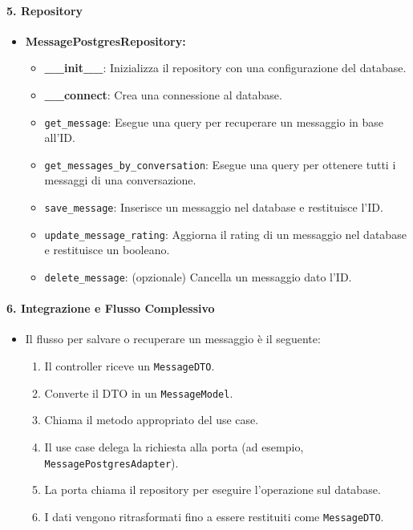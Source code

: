     \paragraph{5. Repository}
    \begin{itemize}
        \item \textbf{MessagePostgresRepository:}
        \begin{itemize}
            \item \textbf{\_\_init\_\_}: Inizializza il repository con una configurazione del database.
            \item \textbf{\_\_connect}: Crea una connessione al database.
            \item \texttt{get\_message}: Esegue una query per recuperare un messaggio in base all’ID.
            \item \texttt{get\_messages\_by\_conversation}: Esegue una query per ottenere tutti i messaggi di una conversazione.
            \item \texttt{save\_message}: Inserisce un messaggio nel database e restituisce l'ID.
            \item \texttt{update\_message\_rating}: Aggiorna il rating di un messaggio nel database e restituisce un booleano.
            \item \texttt{delete\_message}: (opzionale) Cancella un messaggio dato l'ID.
        \end{itemize}
    \end{itemize}

    \paragraph{6. Integrazione e Flusso Complessivo}
    \begin{itemize}
        \item Il flusso per salvare o recuperare un messaggio è il seguente:
        \begin{enumerate}
            \item Il controller riceve un \texttt{MessageDTO}.
            \item Converte il DTO in un \texttt{MessageModel}.
            \item Chiama il metodo appropriato del use case.
            \item Il use case delega la richiesta alla porta (ad esempio, \texttt{MessagePostgresAdapter}).
            \item La porta chiama il repository per eseguire l'operazione sul database.
            \item I dati vengono ritrasformati fino a essere restituiti come \texttt{MessageDTO}.
        \end{enumerate}
    \end{itemize}

